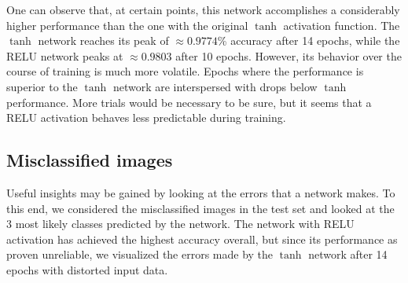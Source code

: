\documentclass[11pt, a4paper]{article}
\begin{document}
One can observe that, at certain points, this network accomplishes a considerably higher performance than the one with the original $\tanh$ activation function. The $\tanh$ network reaches its peak of $\approx 0.9774$\% accuracy after 14 epochs, while the RELU network peaks at $\approx 0.9803$ after 10 epochs. However, its behavior over the course of training is much more volatile. Epochs where the performance is superior to the $\tanh$ network are interspersed with drops below $\tanh$ performance. More trials would be necessary to be sure, but it seems that a RELU activation behaves less predictable during training.

\subsection{Misclassified images}
Useful insights may be gained by looking at the errors that a network makes. To this end, we considered the misclassified images in the test set and looked at the 3 most likely classes predicted by the network. The network with RELU activation has achieved the highest accuracy overall, but since its performance as proven unreliable, we visualized the errors made by the $\tanh$ network after 14 epochs with distorted input data.
\end{document}
